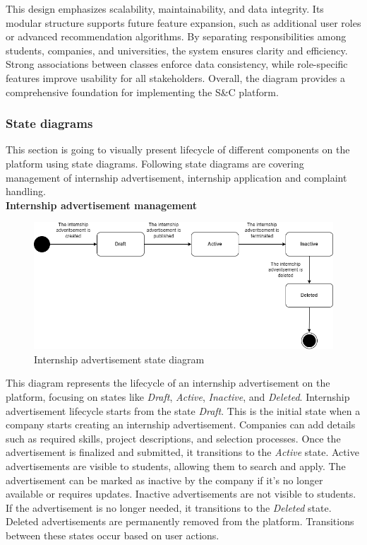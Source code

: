 This design emphasizes scalability, maintainability, and data integrity. Its modular structure supports future feature expansion, such as additional user roles or advanced recommendation algorithms. By separating responsibilities among students, companies, and universities, the system ensures clarity and efficiency. Strong associations between classes enforce data consistency, while role-specific features improve usability for all stakeholders. Overall, the diagram provides a comprehensive foundation for implementing the S\&C platform.


\subsubsection{State diagrams}

This section is going to visually present lifecycle of different components on the platform using state diagrams. Following state diagrams are covering management of internship advertisement, internship application and complaint handling. \\

\textbf{Internship advertisement management}\\
\begin{figure}[H]
	\includegraphics[width=\textwidth,height=\textheight,keepaspectratio]{RASD-Latex/assets/state_diagram.png}
	\caption{Internship advertisement state diagram}
	\label{fig:DataRequest}
\end{figure}

This diagram represents the lifecycle of an internship advertisement on the platform, focusing on states like \textit{Draft}, \textit{Active}, \textit{Inactive}, and \textit{Deleted}. Internship advertisement lifecycle starts from the state \textit{Draft}. This is the initial state when a company starts creating an internship advertisement.
Companies can add details such as required skills, project descriptions, and selection processes. Once the advertisement is finalized and submitted, it transitions to the \textit{Active} state. Active advertisements are visible to students, allowing them to search and apply. The advertisement can be marked as inactive by the company if it's no longer available or requires updates. Inactive advertisements are not visible to students. If the advertisement is no longer needed, it transitions to the \textit{Deleted} state. Deleted advertisements are permanently removed from the platform. Transitions between these states occur based on user actions.\\


